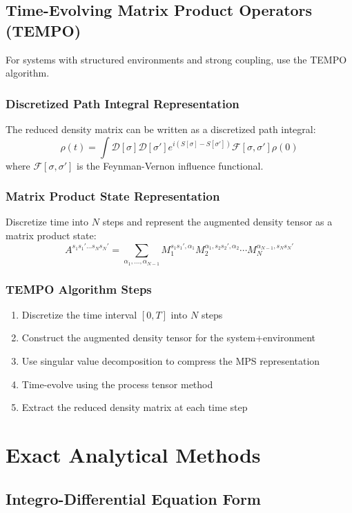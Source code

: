 \documentclass[12pt]{article}
\begin{document}
\subsection{Time-Evolving Matrix Product Operators (TEMPO)}

For systems with structured environments and strong coupling, use the TEMPO algorithm.

\subsubsection{Discretized Path Integral Representation}
The reduced density matrix can be written as a discretized path integral:
\[
\rho(t) = \int \mathcal{D}[\sigma] \mathcal{D}[\sigma'] e^{i(S[\sigma] - S[\sigma'])} \mathcal{F}[\sigma,\sigma'] \rho(0)
\]
where $\mathcal{F}[\sigma,\sigma']$ is the Feynman-Vernon influence functional.

\subsubsection{Matrix Product State Representation}
Discretize time into $N$ steps and represent the augmented density tensor as a matrix product state:
\[
A^{s_1 s_1' \ldots s_N s_N'} = \sum_{\alpha_1,\ldots,\alpha_{N-1}} M_1^{s_1 s_1',\alpha_1} M_2^{\alpha_1,s_2 s_2',\alpha_2} \cdots M_N^{\alpha_{N-1},s_N s_N'}
\]

\subsubsection{TEMPO Algorithm Steps}
\begin{enumerate}
    \item Discretize the time interval $[0,T]$ into $N$ steps
    \item Construct the augmented density tensor for the system+environment
    \item Use singular value decomposition to compress the MPS representation
    \item Time-evolve using the process tensor method
    \item Extract the reduced density matrix at each time step
\end{enumerate}

\section{Exact Analytical Methods}

\subsection{Integro-Differential Equation Form}
\end{document}
